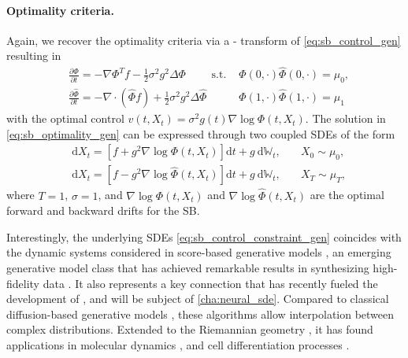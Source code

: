 \paragraph{Optimality criteria.}
Again, we recover the optimality criteria via a \citeauthor{hopf1950partial}-\citeauthor{cole1951quasi} transform  of \eqref{eq:sb_control_gen} resulting in
\begin{align} \label{eq:sb_optimality_gen}
& \frac{\partial \Phi}{\partial t}=-\nabla \Phi^{T } f- \frac{1}{2}\sigma^2 g^2 \Delta \Phi \quad \quad \text { s.t. } &\Phi(0, \cdot) \widehat{\Phi}(0,  \cdot)=\mu_0, \\
\nonumber & \frac{\partial \widehat{\Phi}}{\partial t}=-\nabla \cdot(\widehat{\Phi} f)+\frac{1}{2}\sigma^2 g^2 \Delta \widehat{\Phi} \quad &  \Phi(1, \cdot) \widehat{\Phi}(1, \cdot)=\mu_1
\end{align}
with the optimal control $v(t, X_t)= \sigma^2 g(t) \nabla \log \Phi\left(t, X_t\right)$.
The solution in \eqref{eq:sb_optimality_gen} can be expressed through two coupled SDEs of the form \citep{leonard2013survey}
\begin{align}
\label{eq:sb_forward} 
& \mathrm{d} X_t=\left[f+g^2 \nabla \log \Phi\left(t, X_t\right)\right] \mathrm{d} t+g \mathrm{~d} \mathbb{W}_t, \quad & X_0 \sim \mu_0, \\
\label{eq:sb_backward}
& \mathrm{d} X_t=\left[f-g^2 \nabla \log \widehat{\Phi}\left(t, X_t\right)\right] \mathrm{d} t+g \mathrm{~d} \mathbb{W}_t, \quad & X_T \sim \mu_T,
\end{align}
where $T = 1$, $\sigma = 1$, and $\nabla \log \Phi\left(t, X_t\right)$ and $\nabla \log \widehat{\Phi}\left(t, X_t\right)$ are the optimal forward and backward drifts for the \acrlong{SB}.

 Interestingly, the underlying SDEs  \eqref{eq:sb_control_constraint_gen} coincides with the dynamic systems considered in score-based generative models \citep{song2020score}, an emerging generative model class that has achieved remarkable results in synthesizing high-fidelity data \citep{song2019generative, kong2020diffwave}.
It also represents a key connection that has recently fueled the development of  \citep{de2021diffusion, chen2021stochastic, bunne2022recovering, liu2022deep}, and will be subject of \cref{cha:neural_sde}.
Compared to classical diffusion-based generative models \citep{daniels2021score, song2020score}, these algorithms allow interpolation between complex distributions. Extended to the Riemannian geometry \citep{thornton2022riemannian, de2022riemannian}, it has found applications in molecular dynamics \citep{holdijk2022path, somnath2023aligned}, and cell differentiation processes \citep{vargas2021solving, bunne2022recovering, tong2023conditional}.
